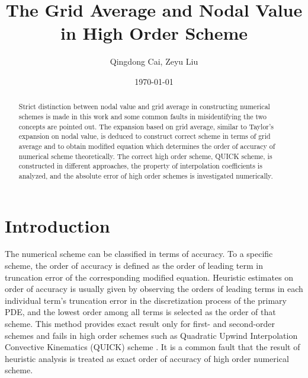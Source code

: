 \documentclass[]{article}
\title{The Grid Average and Nodal Value in High Order Scheme}
\author{Qingdong Cai, Zeyu Liu}
\date{\today}
\begin{document}
\maketitle
\begin{abstract}
    Strict distinction between nodal value and grid average in constructing
    numerical schemes is made in this work and some common faults in
    misidentifying the two concepts are pointed out. 
    The expansion based on grid average,
    similar to Taylor's expansion on nodal value, is deduced to construct
    correct scheme in terms of grid average and to obtain modified equation
    which determines the order of accuracy of numerical scheme theoretically.
    The correct high order scheme, QUICK scheme, is constructed in different
    approaches, the property of interpolation coefficients is analyzed, and
    the absolute error of high order schemes is investigated numerically. 
\end{abstract}
\tableofcontents
\newpage

\section{Introduction}
\label{sec:intro}

The numerical scheme can be classified in terms of accuracy. To a 
specific scheme, the order of accuracy is defined as the order of leading term
in truncation error of the corresponding modified equation. Heuristic estimates on
order of accuracy is usually given by observing the orders of leading terms in
each individual term's truncation error in the discretization process of the
primary PDE, and the lowest order among all terms is selected as the order of that
scheme. This method provides exact result only for first- and second-order 
schemes and fails in high order schemes such as Quadratic Upwind Interpolation
Convective Kinematics (QUICK) scheme \cite{leonard1979stable}.
It is a common fault that the result of heuristic analysis is treated as exact
order of accuracy of high order numerical scheme.
\end{document}

